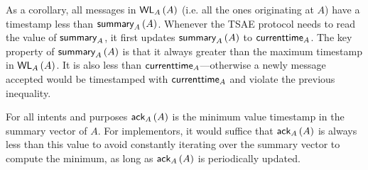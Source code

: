 \documentclass[]             %
{NASA}                       %
\theoremstyle{definition}
\begin{document}
As a corollary, all messages in $\textsf{WL}_{A}\left(A\right)$ (i.e. all the ones
originating at $A$) have a timestamp less than
$\textsf{summary}_{A}\left(A\right)$. Whenever the TSAE protocol needs to read the value
of $\textsf{summary}_{A}$, it first updates $\textsf{summary}_{A}\left(A\right)$ to
$\textsf{currenttime}_{A}$. The key property of $\textsf{summary}_{A}\left(A\right)$ is that it
always greater than the maximum timestamp in $\textsf{WL}_{A}\left(A\right)$. It is also
less than $\textsf{currenttime}_{A}$---otherwise a newly message accepted would
be timestamped with $\textsf{currenttime}_{A}$ and violate the previous
inequality.

For all intents and purposes $\textsf{ack}_{A}\left(A\right)$ is the minimum value
timestamp in the summary vector of $A$. For implementors, it would
suffice that $\textsf{ack}_{A}\left(A\right)$ is always less than this value to avoid
constantly iterating over the summary vector to compute the minimum,
as long as $\textsf{ack}_{A}\left(A\right)$ is periodically updated.
\end{document}
